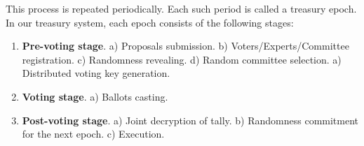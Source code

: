This process is repeated periodically. Each such period is called a treasury epoch. In our treasury system, each epoch consists of the following stages:
\begin{enumerate}[leftmargin=5em, itemsep=0em]
    \item \textbf{Pre-voting stage}.
        \subitem a) Proposals submission.
        \subitem b) Voters/Experts/Committee registration.
        \subitem c) Randomness revealing.
        \subitem d) Random committee selection.
        \subitem a) Distributed voting key generation.
    \item \textbf{Voting stage}.
        \subitem a) Ballots casting.
    \item \textbf{Post-voting stage}.
        \subitem a) Joint decryption of tally.
        \subitem b) Randomness commitment for the next epoch.
        \subitem c) Execution.
\end{enumerate}

